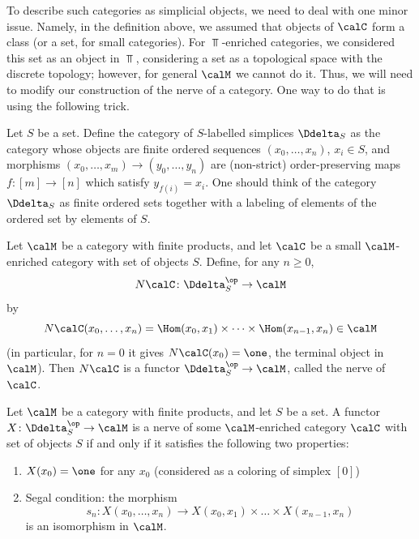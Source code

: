 To describe such categories as simplicial objects, we need to deal with one
minor issue. Namely, in the definition above, we assumed that objects of $\calC$
form a class (or a set, for small categories). For $\Top$-enriched categories,
we considered this set as an object in $\Top$, considering a set as a
topological space with the discrete topology; however, for general $\calM$ we
cannot do it. Thus, we will need to modify our construction of the nerve of a
category. One way to do that is using the following trick.

Let $S$ be a set. Define the category of $S$-labelled simplices $\Ddelta_S$ as
the category whose objects are finite ordered sequences $(x_0, \dots, x_n)$,
$x_i \in S$, and morphisms $(x_0, \dots, x_m)\to (y_0, \dots, y_n)$ are
(non-strict) order-preserving maps $f\colon [m]\to [n]$ which satisfy
$y_{f(i)}=x_i$. One should think of the category $\Ddelta_S$ as finite ordered
sets together with a labeling of elements of the ordered set by elements of $S$.


\begin{definition}\label{d:nerve-enriched}
  Let $\calM$ be a category with finite products, and let $\calC$ be a small
  $\calM$-enriched category with set of objects $S$. Define, for any $n\ge 0$,
  $$
    N\calC\colon \Ddelta_S^\op\to \calM
  $$
  by
  $$
    N\calC(x_0, \dots, x_n)
    =\Hom(x_0, x_1)\times \dots\times \Hom(x_{n-1}, x_n)\in \calM
  $$
  (in particular, for $n=0$ it gives
  $N\calC (x_0)=\one$, the terminal object in $\calM$).
  Then $N\calC$ is a functor $\Ddelta_S^\op\to \calM$, called the nerve of
  $\calC$.
\end{definition}

\begin{theorem}\label{t:nerve-enriched}
  Let $\calM$ be a category with finite products, and let $S$ be a set. A
  functor $X\colon \Ddelta_S^\op\to \calM$ is a nerve of some $\calM$-enriched
  category $\calC$ with set of objects $S$ if and only if it satisfies the
  following two properties:
  \begin{enumerate}
    \item $X(x_0)=\one$ for any $x_0$ \textup{(}considered as a coloring of simplex
      $[0]$\textup{)}
    \item Segal condition: the morphism
    $$
      s_n\colon X(x_0, \dots, x_n)\to
        X(x_0, x_1)\times \dots\times X(x_{n-1}, x_n)
    $$
    is an isomorphism in $\calM$.
  \end{enumerate}
\end{theorem}

